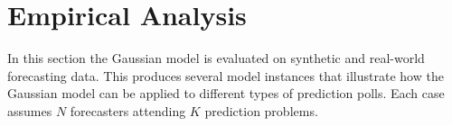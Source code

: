 \documentclass[11pt]{article}
\newcommand{\R}{\mathbb{R}}
\newcommand{\E}{\mathbb{E}}
\theoremstyle{definition}
\theoremstyle{definition}
\def\E{{\mathbb E}}
\begin{document}
\section{Empirical Analysis}
\label{empirical}
In this section the Gaussian model is evaluated on synthetic and real-world forecasting data. This produces several model instances that illustrate how the Gaussian model can be applied to different types of prediction polls. Each case assumes $N$ forecasters attending $K$ prediction problems. 


%
%


\end{document}
